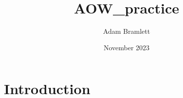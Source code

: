 \documentclass{article}
\title{AOW_practice}
\author{Adam Bramlett}
\date{November 2023}
\begin{document}
\maketitle

\section{Introduction}
\end{document}
